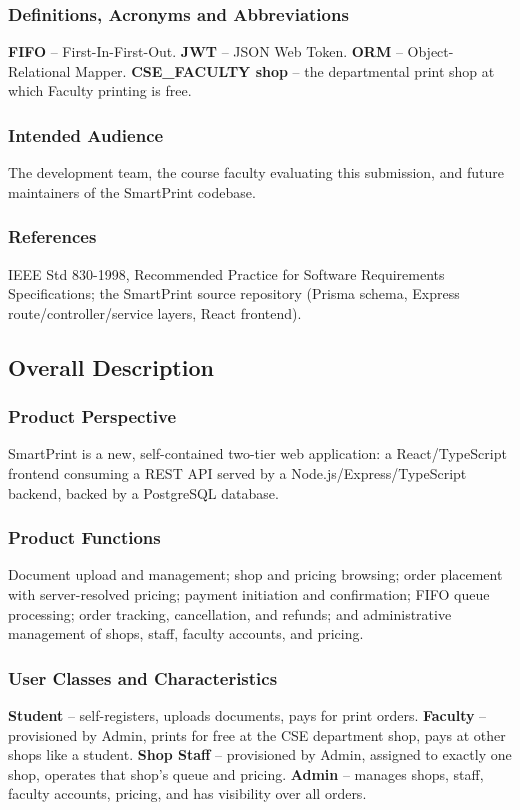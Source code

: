 \documentclass[12pt,a4paper]{report}
\begin{document}
\subsubsection*{Definitions, Acronyms and Abbreviations}
\textbf{FIFO} -- First-In-First-Out. \textbf{JWT} -- JSON Web Token. \textbf{ORM} -- Object-Relational Mapper. \textbf{CSE\_FACULTY shop} -- the departmental print shop at which Faculty printing is free.

\subsubsection*{Intended Audience}
The development team, the course faculty evaluating this submission, and future maintainers of the SmartPrint codebase.

\subsubsection*{References}
IEEE Std 830-1998, Recommended Practice for Software Requirements Specifications; the SmartPrint source repository (Prisma schema, Express route/controller/service layers, React frontend).

\subsection{Overall Description}

\subsubsection*{Product Perspective}
SmartPrint is a new, self-contained two-tier web application: a React/TypeScript frontend consuming a REST API served by a Node.js/Express/TypeScript backend, backed by a PostgreSQL database.

\subsubsection*{Product Functions}
Document upload and management; shop and pricing browsing; order placement with server-resolved pricing; payment initiation and confirmation; FIFO queue processing; order tracking, cancellation, and refunds; and administrative management of shops, staff, faculty accounts, and pricing.

\subsubsection*{User Classes and Characteristics}
\textbf{Student} -- self-registers, uploads documents, pays for print orders. \textbf{Faculty} -- provisioned by Admin, prints for free at the CSE department shop, pays at other shops like a student. \textbf{Shop Staff} -- provisioned by Admin, assigned to exactly one shop, operates that shop's queue and pricing. \textbf{Admin} -- manages shops, staff, faculty accounts, pricing, and has visibility over all orders.
\end{document}
